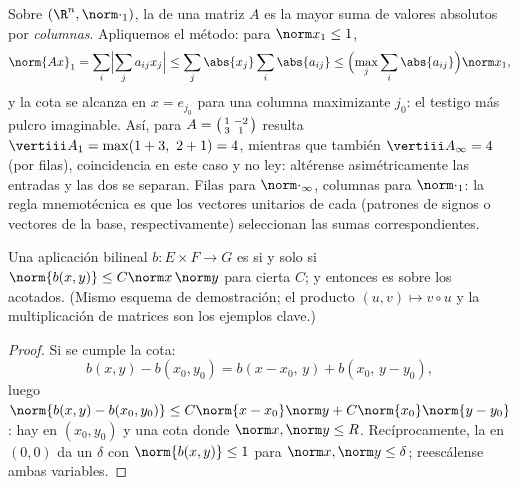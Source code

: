 \begin{example}\label{ex:b2:nvs:columnsums}
Sobre $(\R^n, \norm\cdot_1)$, la  de una matriz
$A$ es la mayor suma de valores absolutos por \emph{columnas}.
Apliquemos el método: para $\norm x_1 \leq 1$,
\[
\norm{Ax}_1 = \sum_i\Bigl|\sum_j a_{ij}x_j\Bigr|
\leq \sum_j \abs{x_j}\sum_i\abs{a_{ij}}
\leq \Bigl(\max_j\sum_i\abs{a_{ij}}\Bigr)\norm x_1 ,
\]
y la cota se alcanza en $x = e_{j_0}$ para una columna maximizante
$j_0$: el testigo más pulcro imaginable. Así, para $A =
\begin{psmallmatrix}1 & -2\\ 3 & 1\end{psmallmatrix}$ resulta
$\vertiii A_1 = \max(1 + 3,\ 2 + 1) = 4$, mientras que también
$\vertiii A_\infty = 4$ (por filas), coincidencia en este caso y no
ley: altérense asimétricamente las entradas y las dos  se
separan. Filas para $\norm\cdot_\infty$, columnas para
$\norm\cdot_1$: la regla mnemotécnica es que los vectores unitarios
de cada  (patrones de signos o vectores de la base,
respectivamente) seleccionan las sumas correspondientes.
\end{example}

\begin{proposition}\label{prop:b2:nvs:bilinear}
Una aplicación bilineal $b \colon E \times F \to G$ es  si
y solo si $\norm{b(x,y)} \leq C\norm x\,\norm y$ para cierta $C$; y
entonces es  sobre los acotados. (Mismo esquema de
demostración; el producto $(u, v) \mapsto v \circ u$ y la
multiplicación de matrices son los ejemplos clave.)
\end{proposition}

\begin{proof}
Si se cumple la cota:
\[
b(x,y) - b(x_0,y_0) = b(x - x_0,\, y) + b(x_0,\, y - y_0),
\]
luego $\norm{b(x,y) - b(x_0,y_0)} \leq C\norm{x - x_0}\norm y +
C\norm{x_0}\norm{y - y_0}$: hay  en $(x_0, y_0)$ y una
cota  donde $\norm x, \norm y \leq R$. Recíprocamente,
la  en $(0,0)$ da un $\delta$ con $\norm{b(x,y)} \leq 1$
para $\norm x, \norm y \leq \delta$; reescálense ambas variables.
\end{proof}

